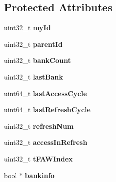 \subsection*{Protected Attributes}
\begin{DoxyCompactItemize}
\item 
\hypertarget{classMemRankBase_a4b904ede9e32196cb5dcf34098029f01}{uint32\-\_\-t {\bfseries my\-Id}}\label{classMemRankBase_a4b904ede9e32196cb5dcf34098029f01}

\item 
\hypertarget{classMemRankBase_a5cb3737f7dfc01c334f7556646f3680a}{uint32\-\_\-t {\bfseries parent\-Id}}\label{classMemRankBase_a5cb3737f7dfc01c334f7556646f3680a}

\item 
\hypertarget{classMemRankBase_a17c1ad412fec857afc886e70d2cc7bbc}{uint32\-\_\-t {\bfseries bank\-Count}}\label{classMemRankBase_a17c1ad412fec857afc886e70d2cc7bbc}

\item 
\hypertarget{classMemRankBase_a381d1dd95e2577b15055ed7d8cdc258f}{uint32\-\_\-t {\bfseries last\-Bank}}\label{classMemRankBase_a381d1dd95e2577b15055ed7d8cdc258f}

\item 
\hypertarget{classMemRankBase_a328af2885e948b30f47cb4b7a24871eb}{uint64\-\_\-t {\bfseries last\-Access\-Cycle}}\label{classMemRankBase_a328af2885e948b30f47cb4b7a24871eb}

\item 
\hypertarget{classMemRankBase_a98b3bfc0bdd03e7193fc5f8ea5711d53}{uint64\-\_\-t {\bfseries last\-Refresh\-Cycle}}\label{classMemRankBase_a98b3bfc0bdd03e7193fc5f8ea5711d53}

\item 
\hypertarget{classMemRankBase_ab58cde59becf2491a58d30383cc72690}{uint32\-\_\-t {\bfseries refresh\-Num}}\label{classMemRankBase_ab58cde59becf2491a58d30383cc72690}

\item 
\hypertarget{classMemRankBase_a35d0773a1d81cdf96cd4f7b98777b694}{uint32\-\_\-t {\bfseries access\-In\-Refresh}}\label{classMemRankBase_a35d0773a1d81cdf96cd4f7b98777b694}

\item 
\hypertarget{classMemRankBase_ad10402fd62d14f85eded3334396d1fe2}{uint32\-\_\-t {\bfseries t\-F\-A\-W\-Index}}\label{classMemRankBase_ad10402fd62d14f85eded3334396d1fe2}

\item 
\hypertarget{classMemRankBase_a1c9d0482a6fe58c494694c4853615e54}{bool $\ast$ {\bfseries bankinfo}}\label{classMemRankBase_a1c9d0482a6fe58c494694c4853615e54}


\end{DoxyCompactItemize}
